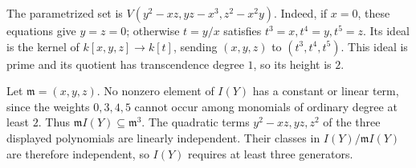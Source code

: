 The parametrized set is $V(y^2-xz,yz-x^3,z^2-x^2y)$. Indeed, if $x=0$, these equations give $y=z=0$; otherwise $t=y/x$ satisfies $t^3=x,t^4=y,t^5=z$. Its ideal is the kernel of $k[x,y,z]\to k[t]$, sending $(x,y,z)$ to $(t^3,t^4,t^5)$. This ideal is prime and its quotient has transcendence degree $1$, so its height is $2$.

Let $\mathfrak m=(x,y,z)$. No nonzero element of $I(Y)$ has a constant or linear term, since the weights $0,3,4,5$ cannot occur among monomials of ordinary degree at least $2$. Thus $\mathfrak m I(Y)\subseteq\mathfrak m^3$. The quadratic terms $y^2-xz,yz,z^2$ of the three displayed polynomials are linearly independent. Their classes in $I(Y)/\mathfrak m I(Y)$ are therefore independent, so $I(Y)$ requires at least three generators.
